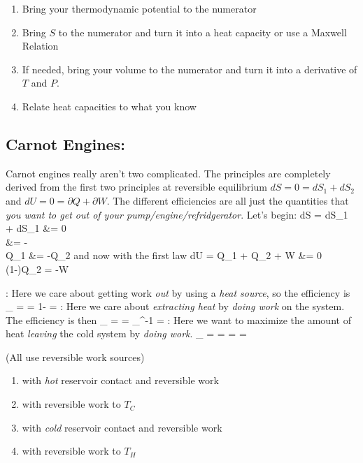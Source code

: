 \documentclass[12pt]{article}
\begin{document}
\begin{enumerate}[1.]
\item Bring your thermodynamic potential to the numerator
\item Bring $S$ to the numerator and turn it into a heat capacity or use a Maxwell Relation
\item If needed, bring your volume to the numerator and turn it into a derivative of $T$ and $P$.
\item Relate heat capacities to what you know
\end{enumerate}

\subsection{Carnot Engines:}
Carnot engines really aren't two complicated.  The principles are completely derived from the first two principles at reversible equilibrium $dS = 0 = dS_1 + dS_2$ and $dU = 0 = \partial Q + \partial W$.  The different efficiencies are all just the quantities that \emph{you want to get out of your pump/engine/refridgerator}.  Let's begin:
\eqs
dS = dS_1 + dS_1 &= 0\\
 &= -\\
\partial Q_1 &= -\partial Q_2 
\eqe
and now with the first law
\eqs
dU = \partial Q_1 + \partial Q_2 + \partial W &= 0\\
(1-)\partial Q_2 = -\partial W
\eqe

:  Here we care about getting work \emph{out} by using a \emph{heat source}, so the efficiency is
\eqs
\mu_ =  = 1- = 
\eqe
{}: Here we care about \emph{extracting heat} by \emph{doing work} on the system.  The efficiency is then
\eqs
\mu_ =  = \mu_^{-1} = 
\eqe
{}: Here we want to maximize the amount of heat \emph{leaving} the cold system by \emph{doing work}.
\eqs
\mu_ =  = =  = 
\eqe

 (All use reversible work sources)
\begin{enumerate}
\item {} with \emph{hot} reservoir contact and reversible work
\item {} with reversible work to $T_C$
\item {} with \emph{cold} reservoir contact and reversible work
\item {} with reversible work to $T_H$
\end{enumerate}
\end{document}
